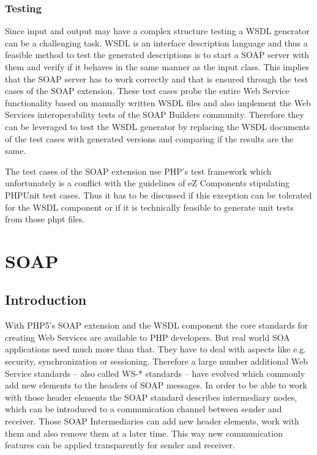 \documentclass[10pt,final,a4paper,oneside]{article}
\begin{document}
\subsubsection{Testing}
Since input and output may have a complex structure
testing a WSDL generator can be a challenging task.
WSDL is an interface description language
and thus a feasible method to test the generated descriptions
is to start a SOAP server with them
and verify if it behaves in the same manner as the input class.
This implies that the SOAP server has to work correctly
and that is ensured through the test cases of the SOAP extension.
These test cases probe the entire Web Service functionality
based on manually written WSDL files and also implement the
Web Services interoperability tests of the SOAP Builders community.
Therefore they can be leveraged to test the WSDL generator
by replacing the WSDL documents of the test cases
with generated versions
and comparing if the results are the same.

The test cases of the SOAP extension use PHP's test framework
which unfortunately is a conflict with the guidelines of eZ Components
stipulating PHPUnit test cases.
Thus it has to be discussed
if this exception can be tolerated for the WSDL component
or if it is technically feasible to generate unit tests
from those phpt files.





\section{SOAP}\label{sec:SOAP}
%
\subsection{Introduction}
With PHP5's SOAP extension and the WSDL component
the core standards for creating Web Services
are available to PHP developers.
But real world SOA applications need much more than that.
They have to deal with aspects
like e.g. security, synchronization or sessioning.
Therefore a large number additional Web Service standards
-- also called WS-* standards --
have evolved which commonly add new elements
to the headers of SOAP messages.
In order to be able to work with those header elements
the SOAP standard describes intermediary nodes,
which can be introduced to a communication channel
between sender and receiver.
Those SOAP Intermediaries
can add new header elements, work with them
and also remove them at a later time.
This way new communication features can be applied
transparently for sender and receiver.
\end{document}
